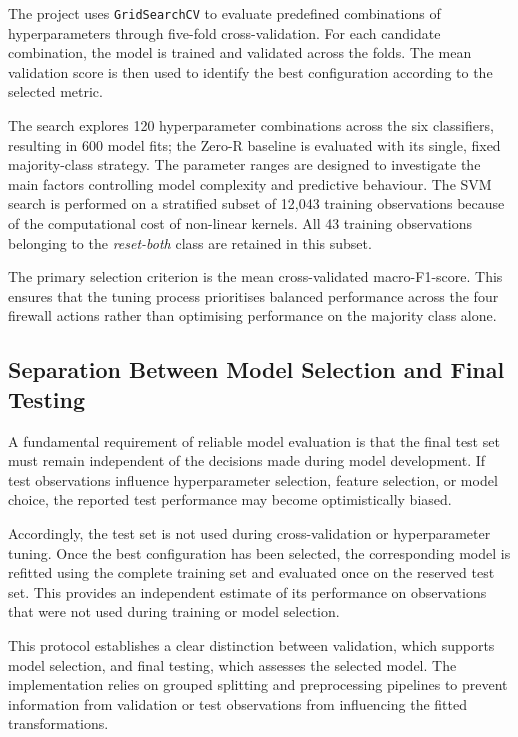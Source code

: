 The project uses \texttt{GridSearchCV} to evaluate predefined combinations of hyperparameters through five-fold cross-validation. For each candidate combination, the model is trained and validated across the folds. The mean validation score is then used to identify the best configuration according to the selected metric.

The search explores 120 hyperparameter combinations across the six classifiers, resulting in 600 model fits; the Zero-R baseline is evaluated with its single, fixed majority-class strategy. The parameter ranges are designed to investigate the main factors controlling model complexity and predictive behaviour. The SVM search is performed on a stratified subset of 12,043 training observations because of the computational cost of non-linear kernels. All 43 training observations belonging to the \emph{reset-both} class are retained in this subset.

The primary selection criterion is the mean cross-validated macro-F1-score. This ensures that the tuning process prioritises balanced performance across the four firewall actions rather than optimising performance on the majority class alone.

\subsection{Separation Between Model Selection and Final Testing}

A fundamental requirement of reliable model evaluation is that the final test set must remain independent of the decisions made during model development. If test observations influence hyperparameter selection, feature selection, or model choice, the reported test performance may become optimistically biased.

Accordingly, the test set is not used during cross-validation or hyperparameter tuning. Once the best configuration has been selected, the corresponding model is refitted using the complete training set and evaluated once on the reserved test set. This provides an independent estimate of its performance on observations that were not used during training or model selection.

This protocol establishes a clear distinction between validation, which supports model selection, and final testing, which assesses the selected model. The implementation relies on grouped splitting and preprocessing pipelines to prevent information from validation or test observations from influencing the fitted transformations.

